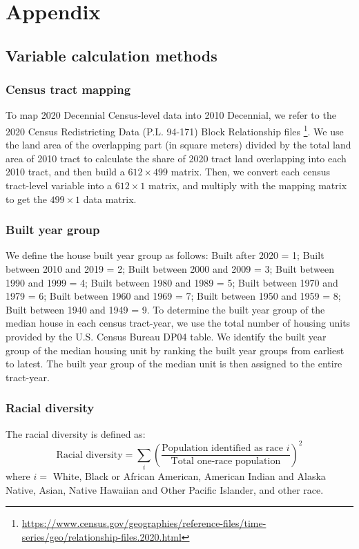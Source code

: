\documentclass[11pt,twoside,letterpaper]{article}
\begin{document}
\newpage
\appendix
{}
\section[Appendix]{Appendix}

\subsection{Variable calculation methods}
\label{subsec:Variable_Cal}
\subsubsection*{Census tract mapping}
To map 2020 Decennial Census-level data into 2010 Decennial, we refer to the 2020 Census Redistricting Data (P.L. 94-171) Block Relationship files \footnote{\url{https://www.census.gov/geographies/reference-files/time-series/geo/relationship-files.2020.html}}. We use the land area of the overlapping part (in square meters) divided by the total land area of 2010 tract to calculate the share of 2020 tract land overlapping into each 2010 tract, and then build a $612 \times 499$ matrix. Then, we convert each census tract-level variable into a $612 \times 1$ matrix, and multiply with the mapping matrix to get the $499 \times 1$ data matrix.

\subsubsection*{Built year group}
We define the house built year group as follows: Built after 2020 = 1; Built between 2010 and 2019 = 2; Built between 2000 and 2009 = 3; Built between 1990 and 1999 = 4; Built between 1980 and 1989 = 5; Built between 1970 and 1979 = 6; Built between 1960 and 1969 = 7; Built between 1950 and 1959 = 8; Built between 1940 and 1949 = 9. To determine the built year group of the median house in each census tract-year, we use the total number of housing units provided by the U.S. Census Bureau DP04 table. We identify the built year group  of the median housing unit by ranking the built year groups from earliest to latest. The built year group of the median unit is then assigned to the entire tract-year.

\subsubsection*{Racial diversity}
The racial diversity is defined as:
\begin{equation}
\text{Racial diversity} = \sum_{i} \left(\frac{\text{Population identified as race }i}{\text{Total one-race population}}\right)^2
\end{equation}
where $i = $ White, Black or African American, American Indian and Alaska Native,	Asian, Native Hawaiian and Other Pacific Islander, and other race.
\end{document}
